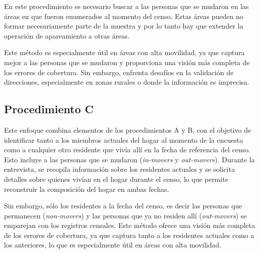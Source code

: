 \documentclass[
  12pt,
]{book}
\begin{document}
En este procedimiento es necesario buscar a las personas que se mudaron en las áreas en que fueron enumerados al momento del censo. Estas áreas pueden no formar necesariamente parte de la muestra y por lo tanto hay que extender la operación de apareamiento a otras áreas.

Este método es especialmente útil en áreas con alta movilidad, ya que captura mejor a las personas que se mudaron y proporciona una visión más completa de los errores de cobertura. Sin embargo, enfrenta desafíos en la validación de direcciones, especialmente en zonas rurales o donde la información es imprecisa.

\hypertarget{procedimiento-c}{%
\subsection{Procedimiento C}\label{procedimiento-c}}

Este enfoque combina elementos de los procedimientos A y B, con el objetivo de identificar tanto a los miembros actuales del hogar al momento de la encuesta como a cualquier otro residente que vivía allí en la fecha de referencia del censo. Esto incluye a las personas que se mudaron (\emph{in-movers} y \emph{out-movers}). Durante la entrevista, se recopila información sobre los residentes actuales y se solicita detalles sobre quienes vivían en el hogar durante el censo, lo que permite reconstruir la composición del hogar en ambas fechas.

Sin embargo, sólo los residentes a la fecha del censo, es decir las personas que permanecen (\emph{non-movers}) y las personas que ya no residen allí (\emph{out-movers}) se emparejan con los registros censales. Este método ofrece una visión más completa de los errores de cobertura, ya que captura tanto a los residentes actuales como a los anteriores, lo que es especialmente útil en áreas con alta movilidad.

  
\end{document}
